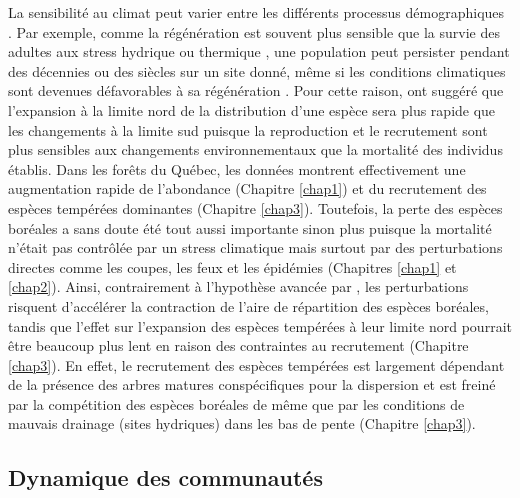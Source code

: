La sensibilité au climat peut varier entre les différents processus
démographiques \citep{niinemets_responses_2010}. Par exemple, comme la
régénération est souvent plus sensible que la survie des adultes aux
stress hydrique ou thermique \citep{niinemets_responses_2010}, une
population peut persister pendant des décennies ou des siècles sur un
site donné, même si les conditions climatiques sont devenues
défavorables à sa régénération \citep{talluto_extinction_2017}. Pour
cette raison, \citet{jump_altitude-for-latitude_2009} ont suggéré que
l'expansion à la limite nord de la distribution d'une espèce sera plus
rapide que les changements à la limite sud puisque la reproduction et le
recrutement sont plus sensibles aux changements environnementaux que la
mortalité des individus établis. Dans les forêts du Québec, les données
montrent effectivement une augmentation rapide de l'abondance (Chapitre
\ref{chap1}) et du recrutement des espèces tempérées dominantes
(Chapitre \ref{chap3}). Toutefois, la perte des espèces boréales a sans
doute été tout aussi importante sinon plus puisque la mortalité n'était
pas contrôlée par un stress climatique mais surtout par des
perturbations directes comme les coupes, les feux et les épidémies
(Chapitres \ref{chap1} et \ref{chap2}). Ainsi, contrairement à
l'hypothèse avancée par \citet{jump_altitude-for-latitude_2009}, les
perturbations risquent d'accélérer la contraction de l'aire de
répartition des espèces boréales, tandis que l'effet sur l'expansion des
espèces tempérées à leur limite nord pourrait être beaucoup plus lent en
raison des contraintes au recrutement (Chapitre \ref{chap3}). En effet,
le recrutement des espèces tempérées est largement dépendant de la
présence des arbres matures conspécifiques pour la dispersion et est
freiné par la compétition des espèces boréales de même que par les
conditions de mauvais drainage (sites hydriques) dans les bas de pente
(Chapitre \ref{chap3}).

\hypertarget{dynamique-des-communautuxe9s}{%
\subsection{Dynamique des
communautés}\label{dynamique-des-communautuxe9s}}

